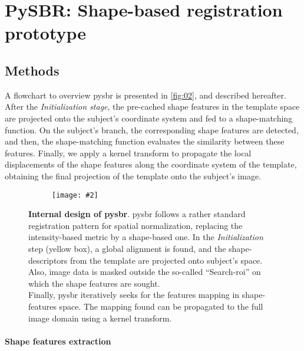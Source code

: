 \documentclass{frontiers}
\newcommand{\insertgraphic}[2]{\texttt{[image: \#2]}}
\newcommand{\insertgraphic}[2]{\texttt{[image: \#2]}}
\begin{document}
\section{PySBR: Shape-based registration prototype}\label{sec:pysbr}
\subsection{Methods}
A flowchart to overview \gls*{pysbr} is presented in \autoref{fig:02},
  and described hereafter.
After the \emph{Initialization stage}, the pre-cached shape features in the template space are projected
  onto the subject's coordinate system and fed to a shape-matching function.
On the subject's branch, the corresponding shape features are detected, and 
  then, the shape-matching function evaluates the similarity between these features.
Finally, we apply a kernel transform to propagate the local displacements of
  the shape features along the coordinate system of the template, obtaining the final
  projection of the template onto the subject's image.

\begin{figure*}[!ht]
\centering
  \begin{subfigure}[bt]{0.65\textwidth}
    \insertgraphic{width=\linewidth}{figures/02-RegistrationFlowDiagram}
  \end{subfigure}
  \hfill
  \begin{minipage}[bt]{0.30\textwidth}
  \caption{\label{fig:02}
  \textbf{Internal design of \gls*{pysbr}}. \Gls*{pysbr} follows a rather standard
  registration pattern for spatial normalization, replacing the intensity-based
  metric by a shape-based one. In the \emph{Initialization} step (yellow box),
  a global alignment is found, and the shape-descriptors from the template
  are projected onto subject's space. Also, image data is masked outside the
  so-called ``Search-\gls*{roi}'' on which the shape features are sought. \\
  Finally, \gls*{pysbr} iteratively seeks for the features mapping in
  shape-features space. The mapping found can be propagated to the full
  image domain using a kernel transform.
  }
  \end{minipage}
\end{figure*}


\paragraph{Shape features extraction}
\label{sec:shape_features}
\end{document}
